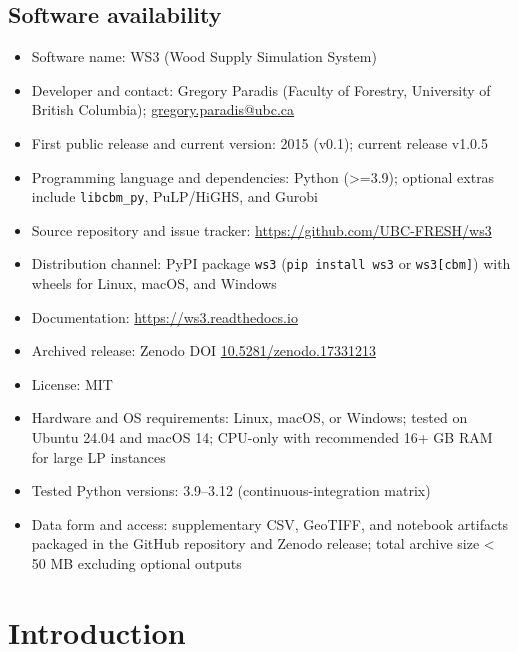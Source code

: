\documentclass[review]{elsarticle}
\begin{document}
\begin{frontmatter}
\section*{Software availability}
\begin{itemize}
  \item Software name: WS3 (Wood Supply Simulation System)
  \item Developer and contact: Gregory Paradis (Faculty of Forestry, University of British Columbia); \href{mailto:gregory.paradis@ubc.ca}{gregory.paradis@ubc.ca}
  \item First public release and current version: 2015 (v0.1); current release v1.0.5
  \item Programming language and dependencies: Python (>=3.9); optional extras include \texttt{libcbm\_py}, PuLP/HiGHS, and Gurobi
  \item Source repository and issue tracker: \url{https://github.com/UBC-FRESH/ws3}
  \item Distribution channel: PyPI package \texttt{ws3} (\texttt{pip install ws3} or \texttt{ws3[cbm]}) with wheels for Linux, macOS, and Windows
  \item Documentation: \url{https://ws3.readthedocs.io}
  \item Archived release: Zenodo DOI \href{https://doi.org/10.5281/zenodo.17331213}{10.5281/zenodo.17331213}
  \item License: MIT
  \item Hardware and OS requirements: Linux, macOS, or Windows; tested on Ubuntu 24.04 and macOS 14; CPU-only with recommended 16+ GB RAM for large LP instances
  \item Tested Python versions: 3.9--3.12 (continuous-integration matrix)
  \item Data form and access: supplementary CSV, GeoTIFF, and notebook artifacts packaged in the GitHub repository and Zenodo release; total archive size < 50 MB excluding optional outputs
\end{itemize}

\end{frontmatter}

\clearpage

\linenumbers

\section{Introduction}
\end{document}
